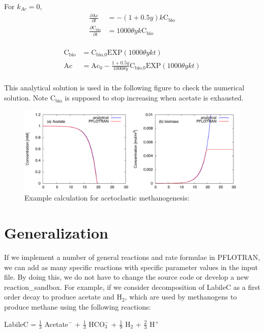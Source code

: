 \documentclass[12pt, a4paper]{article}
\begin{document}
For  $k_{Ac} = 0$, 
\begin{align*}
\frac{\partial \text{Ac}}{\partial t} &= -(1 + 0.5y) k \text{C}_\text{bio} \\
\frac{\partial \text{C}_\text{bio}}{\partial t} &= 1000\theta y k \text{C}_\text{bio} \\
\end{align*}

\begin{align*}
\text{C}_\text{bio} &= \text{C}_\text{bio,0} \text{EXP}(1000\theta ykt) \\
\text{Ac} &= \text{Ac}_0 - \frac{1+0.5y}{1000\theta y}\text{C}_\text{bio,0} \text{EXP}(1000\theta ykt)  \\
\end{align*}

This analytical solution is used in the following figure to check the numerical solution. Note $\text{C}_\text{bio}$ is supposed to stop increasing when acetate is exhausted. 

\begin{figure}[h]
\centering
\includegraphics[width=1.0\textwidth]{../acemeg/fig.pdf}
\caption{Example calculation for acetoclastic methanogenesis: }
\label{Fig4}
\end{figure}

\clearpage
\section{Generalization}
If we implement a number of general reactions and rate formulae in PFLOTRAN, we can add as many specific reactions with specific parameter values in the input file. By doing this, we do not have to change the source code or develop a new reaction\_sandbox. For example, if we consider decomposition of LabileC as a first order decay to produce acetate and H$_2$, which are used by methanogens to produce methane using the following reactions:

LabileC = $\frac{1}{3}$ Acetate$^-$ + $\frac{1}{3}$ HCO$_3^-$ + $\frac{1}{9}$ H$_2$ + $\frac{2}{3}$ H$^+$
\end{document}
